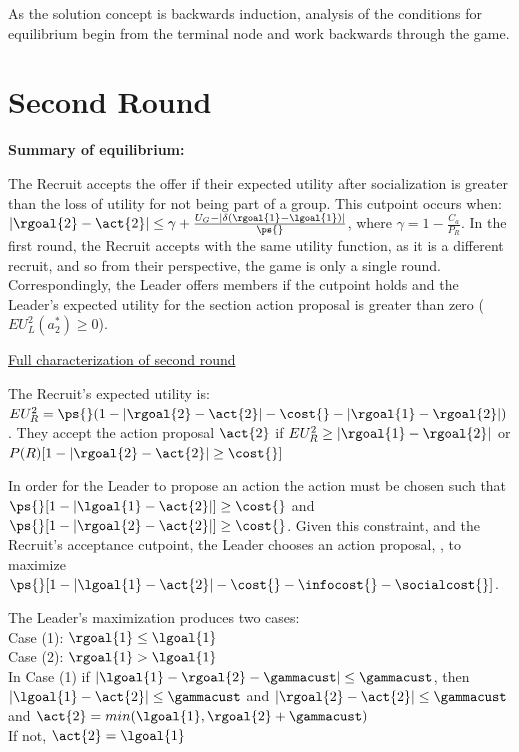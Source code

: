 As the solution concept is backwards induction, analysis of the
conditions for equilibrium begin from the terminal node and work
backwards through the game.

\section{Second Round}

\textbf{Summary of equilibrium:}


The Recruit accepts the offer if their expected utility after socialization is greater than the loss of utility for not being part of a group. This cutpoint occurs when: $|\rgoal{2}-\act{2}|\leq \gamma + \frac{U_{G}- |\delta(\rgoal{1}-\lgoal{1})|}{\ps{}}$, where $\gamma = 1- \frac{C_{a}}{P_{R}}$.  In the first round, the Recruit accepts with the same utility function, as it is a different recruit, and so from their perspective, the game is only a single round. Correspondingly, the Leader offers members if the cutpoint holds and the Leader's expected utility for the section action proposal is greater than zero ($EU^{2}_{L}(a^{*}_{2}) \geq 0$).

\underline{Full characterization of second round}

The Recruit's expected utility is: $EU^{2}_{R} = \ps{}(1- |\rgoal{2}- \act{2}| - \cost{} - |\rgoal{1}-\rgoal{2}|)$. They accept the action proposal $\act{2}$ if $EU^{2}_{R} \geq |\rgoal{1} - \rgoal{2}|$ or $P(R)[1- |\rgoal{2}- \act{2}| \geq \cost{}]$

In order for the Leader to propose an action the action must be chosen such that $\ps{}[1-|\lgoal{1} - \act{2}|] \geq \cost{}$ and $\ps{}[1-|\rgoal{2}- \act{2}|] \geq \cost{}$. Given this constraint, and the Recruit's acceptance cutpoint, the Leader chooses an action proposal, , to maximize $\ps{}[1 -|\lgoal{1}-\act{2}|- \cost{} - \infocost{} - \socialcost{}]$. 

The Leader's maximization produces two cases:\\
Case (1): $\rgoal{1} \leq \lgoal{1}$\\
Case (2): $\rgoal{1} > \lgoal{1}$\\
In Case (1) if $|\lgoal{1}- \rgoal{2}-\gammacust| \leq \gammacust$, then $|\lgoal{1} - \act{2}| \leq \gammacust$ and $|\rgoal{2}- \act{2}| \leq \gammacust$ and  $\act{2} = min(\lgoal{1}, \rgoal{2} + \gammacust)$\\
If not, $\act{2} = \lgoal{1}$

